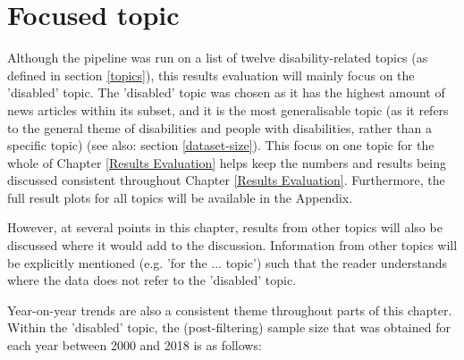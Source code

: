 \documentclass{report}
\begin{document}
\section{Focused topic} \label{Focused topic}
Although the pipeline was run on a list of twelve disability-related topics (as defined in section \ref{topics}), this results evaluation will mainly focus on the 'disabled' topic.
The 'disabled' topic was chosen as it has the highest amount of news articles within its subset, and it is the most generalisable topic (as it refers to the general theme of disabilities and people with disabilities, rather than a specific topic) (see also: section \ref{dataset-size}).
This focus on one topic for the whole of Chapter \ref{Results Evaluation} helps keep the numbers and results being discussed consistent throughout Chapter \ref{Results Evaluation}.
Furthermore, the full result plots for all topics will be available in the Appendix.

However, at several points in this chapter, results from other topics will also be discussed where it would add to the discussion.
Information from other topics will be explicitly mentioned (e.g. 'for the ... topic') such that the reader understands where the data does not refer to the 'disabled' topic.

Year-on-year trends are also a consistent theme throughout parts of this chapter.
Within the 'disabled' topic, the (post-filtering) sample size that was obtained for each year between 2000 and 2018 is as follows:
\end{document}
